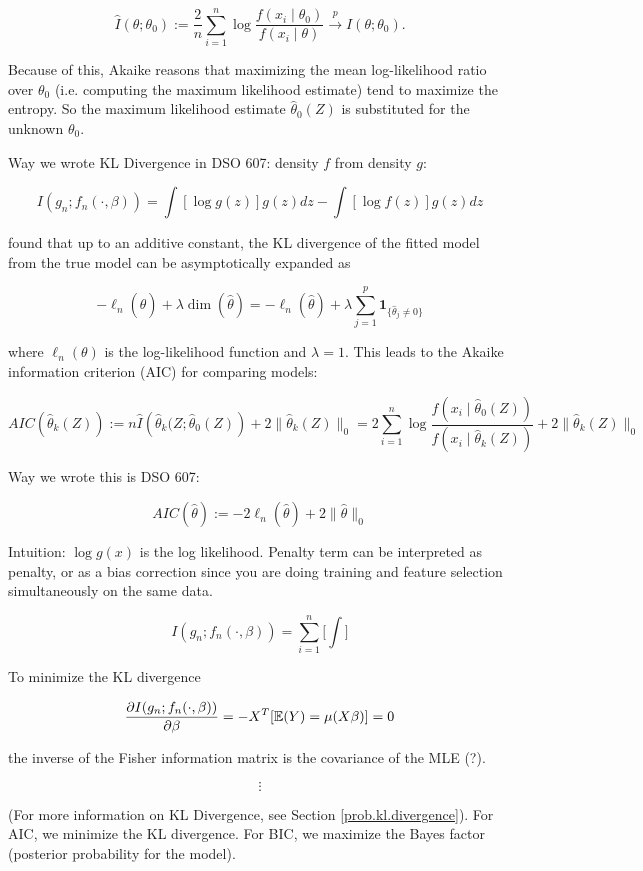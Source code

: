 \[
\hat{I}(\theta; \theta_0) := \frac{2}{n} \sum_{i=1}^n \log \frac{f(x_i \mid \theta_0)}{ f(x_i \mid \theta)} \xrightarrow{p}I(\theta; \theta_0).
\]

Because of this, Akaike reasons that maximizing the mean log-likelihood ratio over \(\theta_0\) (i.e. computing the maximum likelihood estimate) tend to maximize the entropy. So the maximum likelihood estimate \(\hat{\theta}_0(Z)\) is substituted for the unknown \(\theta_0\).

Way we wrote KL Divergence in DSO 607: density \(f\) from density \(g\):

\[
I(g_n; f_n(\cdot, \beta)) = \int[\log g(z)] g(z) dz - \int [\log f(z)] g(z) dz
\]

\citet{Akaike1973} found that up to an additive constant, the KL divergence of the fitted model from the true model can be asymptotically expanded as 

\[
-\ell_n(\hat{\theta}) + \lambda \operatorname{dim}(\hat{\theta}) = -\ell_n(\hat{\theta}) + \lambda \sum_{j=1}^p \boldsymbol{1}_{\{\hat{\theta}_j \neq 0 \}}
\]

where \(\ell_n(\theta)\) is the log-likelihood function and \(\lambda =1\). This leads to the Akaike information criterion (AIC) for comparing models:

\[
AIC \left(\hat{\theta}_k(Z) \right) := n \hat{I} \left(\hat{\theta}_k(Z; \hat{\theta}_0(Z) \right )   + 2\lVert \hat{\theta}_k(Z) \rVert_0 = 2 \sum_{i=1}^n \log \frac{f(x_i \mid  \hat{\theta}_0(Z))}{ f(x_i \mid \hat{\theta}_k(Z))}  + 2\lVert \hat{\theta}_k(Z) \rVert_0 
\]

Way we wrote this is DSO 607:

\[
AIC(\hat{\theta}) := -2 \ell_n(\hat{\theta}) + 2 \lVert \hat{\theta} \rVert_0
\]

Intuition: \(\log g(x)\) is the log likelihood. Penalty term can be interpreted as penalty, or as a bias correction since you are doing training and feature selection simultaneously on the same data.

\[
I(g_n; f_n(\cdot, \beta)) = \sum_{i=1}^n \bigg[ \int \bigg]
\]

To minimize the KL divergence

\[
\pderiv{I(g_n; f_n(\cdot, \beta))}{\beta} = - X^T [ \E(Y) = \mu(X \beta)] = 0
\]

the inverse of the Fisher information matrix is the covariance of the MLE (?).

\[
\vdots
\]

(For more information on KL Divergence, see Section \ref{prob.kl.divergence}). For AIC, we minimize the KL divergence. For BIC, we maximize the Bayes factor (posterior probability for the model).

